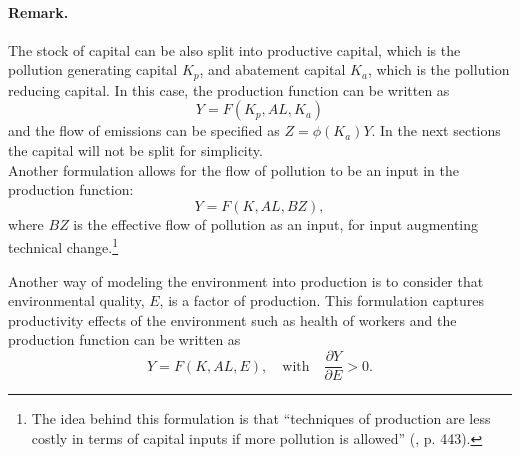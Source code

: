 \paragraph{Remark.} The stock of capital can be also split into productive capital, which is the pollution generating capital $K_p$, and abatement capital $K_a$, which is the pollution reducing capital. In this case, the production function can be written as 
\begin{equation}\label{eq:prod-func-capital-split}
	Y = F(K_p, AL, K_a)
\end{equation}
and the flow of emissions can be specified as $Z=\phi (K_a)Y$. In the next sections the capital will not be split for simplicity. \\

Another formulation \cite{brock_polluted_1973} allows for the flow of pollution to be an input in the production function:
\begin{equation}\label{eq:prod-funct-with-poll}
	Y = F(K, AL, BZ), 
\end{equation}
where $BZ$ is the effective flow of pollution as an input, for input augmenting technical change.\footnote{The idea behind this formulation is that “techniques of production are less costly in terms of capital inputs if more pollution is allowed” (\cite{brock_polluted_1973}, p. 443).}

Another way of modeling the environment into production is to consider that environmental quality, $E$, is a factor of production. This formulation captures productivity effects of the environment such as health of workers and the production function can be written as 
\begin{equation}
	Y = F(K, AL, E), \quad\text{with}\quad \frac{\partial Y}{\partial E}>0.
\end{equation}

